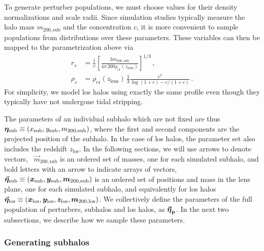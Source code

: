 To generate perturber populations, we must choose values for their density normalizations and scale radii. Since simulation studies typically measure the halo mass $m_\mathrm{200, sub}$ and the concentration $c$, it is more convenient to sample populations from distributions over these parameters. These variables can then be mapped to the parametrization above via
\begin{align}
    r_s &= \frac{1}{c} \left[ \frac{3 m_\mathrm{200, sub}}{4 \pi \, 200 \rho_\mathrm{cr}(z_\mathrm{lens})} \right]^{1/3} \, ,\\
    \rho_s &= \rho_\mathrm{cr}(z_\mathrm{lens}) \, \frac{1}{3} \frac{c^3}{\log(1+c) - c / (1 + c)} \, . 
\end{align}
For simplicity, we model \gls*{los} halos using exactly the same profile even though they typically have not undergone tidal stripping. 

The parameters of an individual subhalo which are not fixed are thus ${{\bm{\eta}}}_\mathrm{sub} \equiv (x_\mathrm{sub}, y_\mathrm{sub}, m_\mathrm{200, sub})$, where the first and second components are the projected position of the subhalo. In the case of \gls*{los} halos, the parameter set also includes the redshift $z_\mathrm{los}$. In the following sections, we will use arrows to denote vectors, \eg~$\vec{m}_\mathrm{200, sub}$ is an ordered set of masses, one for each simulated subhalo, and bold letters with an arrow to indicate arrays of vectors, \eg~ $\vec{{\bm{\eta}}}_\mathrm{sub} \equiv (\bm x_\mathrm{sub}, \bm y_\mathrm{sub}, \bm m_\mathrm{200, sub})$ is an ordered set of positions and mass in the lens plane, one for each simulated subhalo, and equivalently for \gls*{los} halos $\vec{{\bm{\eta}}}_\mathrm{los} \equiv (\bm x_\mathrm{los}, \bm y_\mathrm{{los}}, \bm z_\mathrm{{los}}, \bm m_\mathrm{200, {los}})$. We collectively define the parameters of the full population of perturbers, subhalos and \gls*{los} halos, as $\boldsymbol{\vec{{\bm{\eta}}}_\mathrm{p}}$. In the next two subsections, we describe how we sample these parameters.

\subsubsection{Generating subhalos} \label{subsubsec:sl-model-sub}

